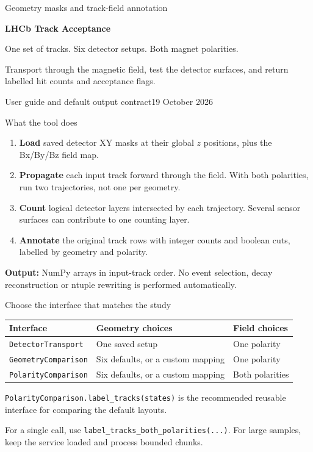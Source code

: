 \documentclass[aspectratio=169,11pt]{beamer}
\begin{document}
\begin{frame}[plain]
\vspace{7mm}
{\color{teal}\large Geometry masks and track-field annotation}\par
\vspace{5mm}
{\fontsize{28}{32}\selectfont\bfseries LHCb Track Acceptance}\par
\vspace{5mm}
\large One set of tracks. Six detector setups. Both magnet polarities.\par
\vspace{9mm}
\normalsize Transport through the magnetic field, test the detector surfaces,
and return labelled hit counts and acceptance flags.\par
\vspace{7mm}
\small User guide and default output contract\hfill 19 October 2026
\end{frame}

\begin{frame}{What the tool does}
\begin{enumerate}
\item \textbf{Load} saved detector XY masks at their global $z$ positions,
plus the Bx/By/Bz field map.
\item \textbf{Propagate} each input track forward through the field.
With both polarities, run two trajectories, not one per geometry.
\item \textbf{Count} logical detector layers intersected by each trajectory.
Several sensor surfaces can contribute to one counting layer.
\item \textbf{Annotate} the original track rows with integer counts and boolean
cuts, labelled by geometry and polarity.
\end{enumerate}
\vspace{3mm}
\textbf{Output:} NumPy arrays in input-track order. No event selection,
decay reconstruction or ntuple rewriting is performed automatically.
\end{frame}

\begin{frame}{Choose the interface that matches the study}
\begin{tabularx}{\textwidth}{@{}lXX@{}}
\toprule Interface & Geometry choices & Field choices \\
\midrule
\texttt{DetectorTransport} & One saved setup & One polarity \\
\texttt{GeometryComparison} & Six defaults, or a custom mapping & One polarity \\
\texttt{PolarityComparison} & Six defaults, or a custom mapping & Both polarities \\
\bottomrule
\end{tabularx}\par
\vspace{5mm}
\texttt{PolarityComparison.label\_tracks(states)} is the recommended reusable
interface for comparing the default layouts.\par
\vspace{3mm}
For a single call, use \texttt{label\_tracks\_both\_polarities(...)}.
For large samples, keep the service loaded and process bounded chunks.
\end{frame}
\end{document}
